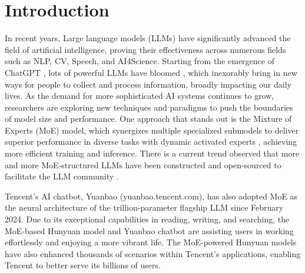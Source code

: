 \documentclass{article}
\begin{document}
\section{Introduction}
In recent years, Large language models (LLMs) have significantly advanced the field of artificial intelligence, proving their effectiveness across numerous fields such as NLP, CV, Speech, and AI4Science. Starting from the emergence of ChatGPT \citep{OpenAI2022ChatGPT}, lots of powerful LLMs have bloomed \citep{achiam2023gpt,Gemini2023gemini,touvron2023llama,OpenAI2024GPT4o,dubey2024llama,QWen2024qwen2-5}, which inexorably bring in new ways for people to collect and process information, broadly impacting our daily lives. As the demand for more sophisticated AI systems continues to grow, researchers are exploring new techniques and paradigms to push the boundaries of model size and performance. One approach that stands out is the Mixture of Experts (MoE) model, which synergizes multiple specialized submodels to deliver superior performance in diverse tasks with dynamic activated experts \citep{lepikhin2020gshard,fedus2022switch,wang2024hmoe}, 
achieving more efficient training and inference. There is a current trend observed that more and more MoE-structured LLMs have been constructed and open-sourced to facilitate the LLM community \citep{mistral2024mixtral8x22,deepseek2024v2,yang2024qwen2,team2024jamba}.

Tencent's AI chatbot, Yuanbao (yuanbao.tencent.com), has also adopted MoE as the neural architecture of the trillion-parameter flagship LLM since February 2024. Due to its exceptional capabilities in reading, writing, and searching, the MoE-based Hunyuan model and Yuanbao chatbot are assisting users in working effortlessly and enjoying a more vibrant life. The MoE-powered Hunyuan models have also enhanced thousands of scenarios within Tencent's applications, enabling Tencent to better serve its billions of users. 
\end{document}
